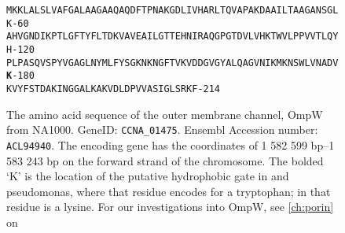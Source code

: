 \begin{figure}[p]
\end{figure}   
\begin{figure}[p]
  	\begin{center}
\label{app:ompwseq}
\texttt{\onehalfspacing\small  MKKLALSLVAFGALAAGAAQAQDFTPNAKGDLIVHARLTQVAPAKDAAILTAAGANSGLK\hfill-60~\\
AHVGNDIKPTLGFTYFLTDKVAVEAILGTTEHNIRAQGPGTDVLVHKTWVLPPVVTLQYH\hfill-120\\
PLPASQVSPYVGAGLNYMLFYSGKNKNGFTVKVDDGVGYALQAGVNIKMKNSWLVNADV\textbf{K}\hfill-180\\
KVYFSTDAKINGGALKAKVDLDPVVASIGLSRKF\hfill-214
}
   	\end{center}
   	\caption[OmpW, amino acid sequence]{
   The amino acid sequence of the outer membrane channel, OmpW from \caulobacter NA1000. GeneID: \texttt{CCNA\_01475}. Ensembl Accession number: \texttt{ACL94940}. The encoding gene has the coordinates of 1 582 599 bp--1 583 243 bp on the forward strand of the \caulobacter chromosome. The bolded `K' is the location of the putative hydrophobic gate in \ecoli and \ac{pseudomonas}, where that residue encodes for a tryptophan; in \caulobacter that residue is a lysine. For our investigations into OmpW, see \cref{ch:porin} on }
\end{figure}   
